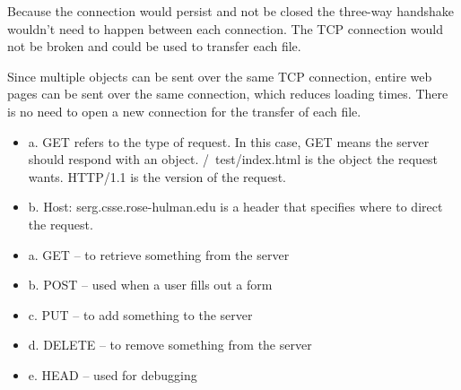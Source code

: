 \documentclass[12pt,letterpaper,boxed]{hmcpset}
\begin{document}
\begin{problem}
\end{problem}
Because the connection would persist and not be closed the three-way handshake wouldn’t need to happen between each connection. The TCP connection would not be broken and could be used to transfer each file.


\begin{problem}
\end{problem}
Since multiple objects can be sent over the same TCP connection, entire web pages can be sent over the same connection, which reduces loading times. There is no need to open a new connection for the transfer of each file.


\begin{problem}
\end{problem}
\begin{itemize}
\item a. GET refers to the type of request. In this case, GET means the 	server should respond with an object. /~test/index.html is the 			object the request wants. HTTP/1.1 is the version of the request.
\item b. Host: serg.csse.rose-hulman.edu is a header that specifies where to direct the request.
\end{itemize}


\begin{problem}
\end{problem}
\begin{itemize}
\item a. GET – to retrieve something from the server
\item b. POST – used when a user fills out a form
\item c. PUT – to add something to the server
\item d. DELETE – to remove something from the server
\item e. HEAD – used for debugging

\end{itemize}
\end{document}
